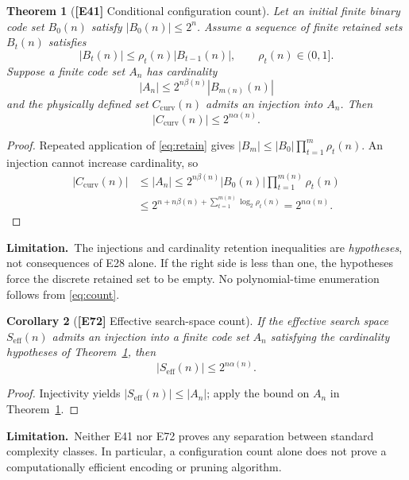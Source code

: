 \documentclass[11pt,letterpaper]{article}
\newtheorem{theorem}{Theorem}[section]
\newtheorem{corollary}[theorem]{Corollary}
\theoremstyle{definition}
\theoremstyle{remark}
\newcommand{\abs}[1]{\left\lvert#1\right\rvert}
\newcommand{\id}[1]{\textnormal{\textbf{[#1]}}}
\newcommand{\scope}{\par\smallskip\noindent\textbf{Limitation.}\ }
\begin{document}
\begin{theorem}[\id{E41} Conditional configuration count]\label{thm:count}
Let an initial finite binary code set $B_0(n)$ satisfy
$\abs{B_0(n)}\le2^n$. Assume a sequence of finite retained sets $B_t(n)$
satisfies
\begin{equation}\label{eq:retain}
\abs{B_t(n)}\le\rho_t(n)\abs{B_{t-1}(n)},\qquad
\rho_t(n)\in(0,1].
\end{equation}
Suppose a finite code set $A_n$ has cardinality
\begin{equation}\label{eq:overhead}
\abs{A_n}\le2^{n\beta(n)}\abs{B_{m(n)}(n)}
\end{equation}
and the physically defined set $C_{\mathrm{curv}}(n)$ admits an
injection into $A_n$. Then
\begin{equation}\label{eq:count}
\boxed{\abs{C_{\mathrm{curv}}(n)}\le2^{n\alpha(n)}}.
\end{equation}
\end{theorem}
\begin{proof}
Repeated application of \eqref{eq:retain} gives
$\abs{B_m}\le\abs{B_0}\prod_{t=1}^m\rho_t(n)$.
An injection cannot increase cardinality, so
\begin{align*}
\abs{C_{\mathrm{curv}}(n)}
&\le\abs{A_n}
\le2^{n\beta(n)}\abs{B_0(n)}\prod_{t=1}^{m(n)}\rho_t(n)\\
&\le2^{n+n\beta(n)+\sum_{t=1}^{m(n)}\log_2\rho_t(n)}
=2^{n\alpha(n)}.
\end{align*}
\end{proof}
\scope The injections and cardinality retention inequalities are
\emph{hypotheses}, not consequences of E28 alone. If the right side is
less than one, the hypotheses force the discrete retained set to be
empty. No polynomial-time enumeration follows from \eqref{eq:count}.

\begin{corollary}[\id{E72} Effective search-space count]\label{cor:eff}
If the effective search space $S_{\mathrm{eff}}(n)$ admits an injection
into a finite code set $A_n$ satisfying the cardinality hypotheses
of Theorem~\ref{thm:count}, then
\begin{equation*}
\boxed{\abs{S_{\mathrm{eff}}(n)}\le2^{n\alpha(n)}}.
\end{equation*}
\end{corollary}
\begin{proof}
Injectivity yields $\abs{S_{\mathrm{eff}}(n)}\le\abs{A_n}$;
apply the bound on $A_n$ in Theorem~\ref{thm:count}.
\end{proof}
\scope Neither E41 nor E72 proves any separation between standard
complexity classes. In particular, a configuration count alone does not
prove a computationally efficient encoding or pruning algorithm.
\end{document}
